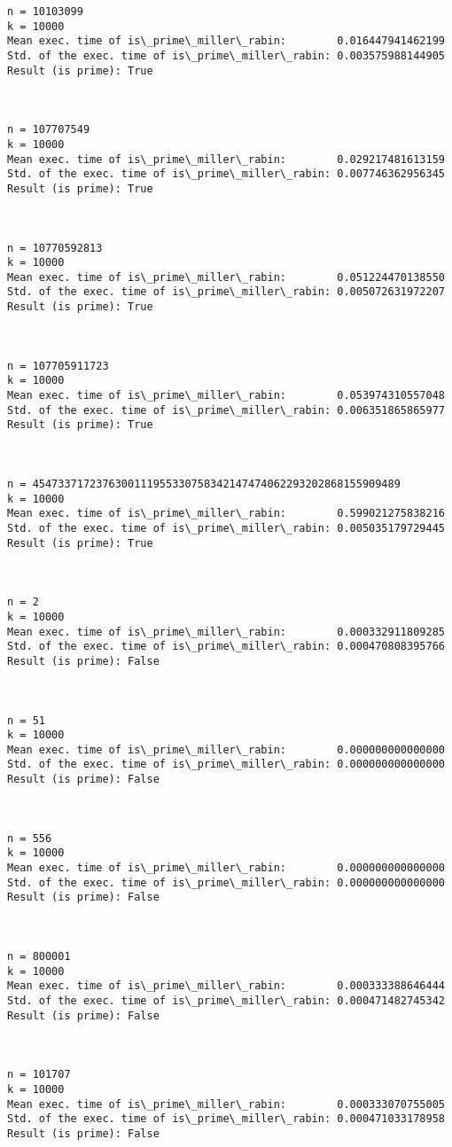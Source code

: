 \documentclass[11pt]{article}
\begin{document}
\begin{Verbatim}[commandchars=\\\{\}]
n = 10103099
k = 10000
Mean exec. time of is\_prime\_miller\_rabin:        0.016447941462199
Std. of the exec. time of is\_prime\_miller\_rabin: 0.003575988144905
Result (is prime): True



n = 107707549
k = 10000
Mean exec. time of is\_prime\_miller\_rabin:        0.029217481613159
Std. of the exec. time of is\_prime\_miller\_rabin: 0.007746362956345
Result (is prime): True



n = 10770592813
k = 10000
Mean exec. time of is\_prime\_miller\_rabin:        0.051224470138550
Std. of the exec. time of is\_prime\_miller\_rabin: 0.005072631972207
Result (is prime): True



n = 107705911723
k = 10000
Mean exec. time of is\_prime\_miller\_rabin:        0.053974310557048
Std. of the exec. time of is\_prime\_miller\_rabin: 0.006351865865977
Result (is prime): True



n = 4547337172376300111955330758342147474062293202868155909489
k = 10000
Mean exec. time of is\_prime\_miller\_rabin:        0.599021275838216
Std. of the exec. time of is\_prime\_miller\_rabin: 0.005035179729445
Result (is prime): True



n = 2
k = 10000
Mean exec. time of is\_prime\_miller\_rabin:        0.000332911809285
Std. of the exec. time of is\_prime\_miller\_rabin: 0.000470808395766
Result (is prime): False



n = 51
k = 10000
Mean exec. time of is\_prime\_miller\_rabin:        0.000000000000000
Std. of the exec. time of is\_prime\_miller\_rabin: 0.000000000000000
Result (is prime): False



n = 556
k = 10000
Mean exec. time of is\_prime\_miller\_rabin:        0.000000000000000
Std. of the exec. time of is\_prime\_miller\_rabin: 0.000000000000000
Result (is prime): False



n = 800001
k = 10000
Mean exec. time of is\_prime\_miller\_rabin:        0.000333388646444
Std. of the exec. time of is\_prime\_miller\_rabin: 0.000471482745342
Result (is prime): False



n = 101707
k = 10000
Mean exec. time of is\_prime\_miller\_rabin:        0.000333070755005
Std. of the exec. time of is\_prime\_miller\_rabin: 0.000471033178958
Result (is prime): False




\end{Verbatim}
\end{document}
